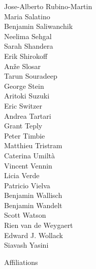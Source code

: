 \documentclass[PICOReport.tex]{subfiles}
\begin{document}
{\begin{multicols}{4}
Jose-Alberto Rubino-Martin      \\
Maria Salatino                  \\
Benjamin Saliwanchik            \\
Neelima Sehgal                  \\
Sarah Shandera                  \\
Erik Shirokoff                  \\
An\v{z}e Slosar                 \\
Tarun Souradeep                 \\
George Stein                    \\
Aritoki Suzuki                  \\
Eric Switzer                    \\
Andrea Tartari                  \\
Grant Teply                     \\
Peter Timbie                    \\
Matthieu Tristram               \\
Caterina Umilt\`{a}             \\
Vincent Vennin                  \\
Licia Verde                     \\
Patricio Vielva                 \\
Benjamin Wallisch               \\
Benjamin Wandelt                \\
Scott Watson                    \\
Rien van de Weygaert            \\
Edward J. Wollack               \\
Siavash Yasini
\end{multicols}
}


\newpage
\Large  {\centerline {Affiliations}}
\end{document}

